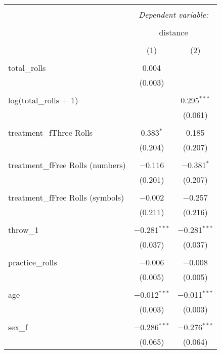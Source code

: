 
\begin{table}[!htbp] \centering 
  \caption{} 
  \label{} 
\begin{tabular}{@{\extracolsep{5pt}}lcc} 
\\[-1.8ex]\hline 
\hline \\[-1.8ex] 
 & \multicolumn{2}{c}{\textit{Dependent variable:}} \\ 
\cline{2-3} 
\\[-1.8ex] & \multicolumn{2}{c}{distance} \\ 
\\[-1.8ex] & (1) & (2)\\ 
\hline \\[-1.8ex] 
 total\_rolls & 0.004 &  \\ 
  & (0.003) &  \\ 
  & & \\ 
 log(total\_rolls + 1) &  & 0.295$^{***}$ \\ 
  &  & (0.061) \\ 
  & & \\ 
 treatment\_fThree Rolls & 0.383$^{*}$ & 0.185 \\ 
  & (0.204) & (0.207) \\ 
  & & \\ 
 treatment\_fFree Rolls (numbers) & $-$0.116 & $-$0.381$^{*}$ \\ 
  & (0.201) & (0.207) \\ 
  & & \\ 
 treatment\_fFree Rolls (symbols) & $-$0.002 & $-$0.257 \\ 
  & (0.211) & (0.216) \\ 
  & & \\ 
 throw\_1 & $-$0.281$^{***}$ & $-$0.281$^{***}$ \\ 
  & (0.037) & (0.037) \\ 
  & & \\ 
 practice\_rolls & $-$0.006 & $-$0.008 \\ 
  & (0.005) & (0.005) \\ 
  & & \\ 
 age & $-$0.012$^{***}$ & $-$0.011$^{***}$ \\ 
  & (0.003) & (0.003) \\ 
  & & \\ 
 sex\_f & $-$0.286$^{***}$ & $-$0.276$^{***}$ \\ 
  & (0.065) & (0.064) \\ 

\end{tabular}
\end{table}
